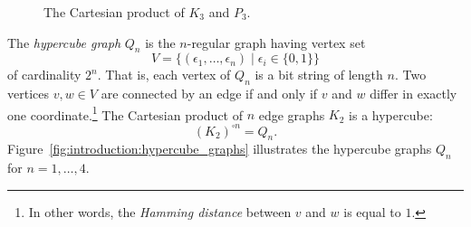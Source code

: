 \begin{figure}[!htbp]
\centering
{}
\qquad
{}
\qquad
{}
\caption{The Cartesian product of $K_3$ and $P_3$.}
\label{fig:introduction:Cartesian_product_K3_P3}
\end{figure}

The \emph{hypercube graph}
$Q_n$ is the $n$-regular graph having vertex set
\[
V
=
\big\{ (\epsilon_1,\dots,\epsilon_n) \;|\; \epsilon_i \in \{0,1\} \big\}
\]
of cardinality $2^n$. That is, each vertex of $Q_n$ is a bit string of
length $n$. Two vertices $v,w \in V$ are connected by an edge if and
only if $v$ and $w$ differ in exactly one coordinate.\footnote{
  In other words, the \emph{Hamming distance}
  between $v$ and $w$ is equal to $1$.
}
The Cartesian product of $n$ edge graphs $K_2$ is a hypercube:
\[
(K_2)^{\square n} = Q_n.
\]
Figure~\ref{fig:introduction:hypercube_graphs} illustrates the
hypercube graphs $Q_n$ for $n = 1,\dots,4$.

